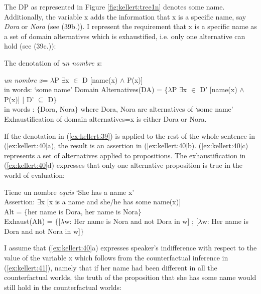 \documentclass[output=paper]{langsci/langscibook}
\begin{document}
The DP as represented in Figure \ref{fig:kellert:tree1n} denotes some name. Additionally, the variable x adds the information that x is a specific name, say \textit{Dora} or \textit{Nora} (see (39b.)). I represent the requirement that x is a specific name as a set of domain alternatives which is exhaustified, i.e. only one alternative can hold (see (39c.)):

\ea\label{ex:kellert:39} The denotation of \textit{un nombre x}:
\begin{xlist}
\ex
{\textlbrackdbl \textit{un nombre x}\textrbrackdbl = $\lambda$P $\exists$x $\in$ D [name(x) $\wedge$ P(x)]}\\
in words: ‘some name’
\ex
{Domain Alternatives(DA) = $\lbrace$$\lambda$P $\exists$x $\in$ D’ [name(x) $\wedge$ P(x)] | D’ $\subseteq$ D$\rbrace$}\\
in words : $\lbrace$Dora, Nora$\rbrace$ where Dora, Nora are alternatives of ‘some name’
\ex
Exhaustification of domain alternatives=x is either Dora or Nora.
\end{xlist}
\z

If the denotation in (\ref{ex:kellert:39}) is applied to the rest of the whole sentence in (\ref{ex:kellert:40}a), the result is an assertion in (\ref{ex:kellert:40}b). (\ref{ex:kellert:40}c) represents a set of alternatives applied to propositions. The exhaustification in (\ref{ex:kellert:40}d) expresses that only one alternative proposition is true in the world of evaluation:

\ea\label{ex:kellert:40}
\begin{xlist}
\ex Tiene un nombre \textit{equis}  ‘She has a name x’\\
\ex Assertion: $\exists$x [x is a name and she/he has some name(x)]\\
\ex Alt = $\lbrace$her name is Dora, her name is Nora$\rbrace$\\
\ex Exhaust(Alt) = $\lbrace${[}$\lambda$w: Her name is Nora and not Dora in w{]} ; {[}$\lambda$w: Her name is Dora and not Nora in w{]}$\rbrace$\\
\end{xlist}
\z

I assume that (\ref{ex:kellert:40}a) expresses speaker's indifference with respect to the value of the variable x which follows from the counterfactual inference in (\ref{ex:kellert:41}), namely that if her name had been different in all the counterfactual worlds, the truth of the proposition that she has some name would still hold in the counterfactual worlds:
\end{document}
